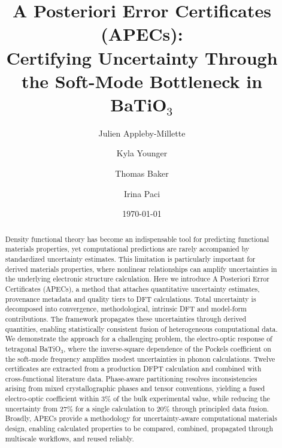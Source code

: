\documentclass[prb,twocolumn,superscriptaddress,amsmath,amssymb,longbibliography]{revtex4-2}
\begin{document}
\title{A Posteriori Error Certificates (APECs): \\ Certifying Uncertainty Through the Soft-Mode Bottleneck in  BaTiO$_3$
}

\author{Julien Appleby-Millette}
\author{Kyla Younger}
\author{Thomas Baker}
\author{Irina Paci}

\date{\today}

\begin{abstract}
Density functional theory has become an indispensable tool for predicting functional materials properties, yet computational predictions are rarely accompanied by standardized uncertainty estimates. This limitation is particularly important for derived materials properties, where nonlinear relationships can amplify uncertainties in the underlying electronic structure calculation. Here we introduce A Posteriori Error Certificates (APECs), a method that attaches quantitative uncertainty estimates,  provenance metadata and quality tiers to DFT calculations. Total uncertainty is decomposed into convergence, methodological, intrinsic DFT and model-form contributions. The framework propagates these uncertainties through derived quantities, enabling statistically consistent fusion of heterogeneous computational data. We demonstrate the approach for a challenging problem, the electro-optic response of 
tetragonal BaTiO$_3$, where the inverse-square dependence of the Pockels coefficient on the soft-mode frequency amplifies modest uncertainties in phonon calculations. Twelve certificates are extracted from a production DFPT 
calculation and combined  with cross-functional literature data. Phase-aware 
partitioning  resolves inconsistencies arising from mixed crystallographic phases and tensor conventions, yielding a fused electro-optic coefficient within 3\% of the bulk experimental value, while reducing the uncertainty from 27\% for a single calculation to 20\% through principled data fusion. Broadly, APECs provide a methodology for uncertainty-aware computational materials design, enabling calculated properties to be compared, combined, propagated through multiscale workflows, and reused reliably. 
\end{abstract}
\end{document}
